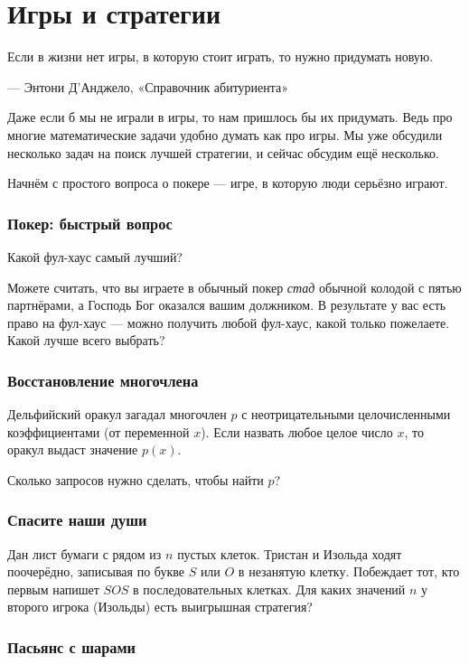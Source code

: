 \chapter{Игры и стратегии}

\setlength{\epigraphwidth}{.63\textwidth}
\epigraph{Если в жизни нет игры, в которую стоит играть, то нужно придумать новую. 
}{— Энтони Д'Анджело, «Справочник абитуриента»}

Даже если б мы не играли в игры, то нам пришлось бы их придумать.
Ведь про многие математические задачи удобно думать как про игры.
Мы уже обсудили несколько задач на поиск лучшей стратегии, и сейчас обсудим ещё несколько.

Начнём с простого вопроса о покере --- игре, в которую люди серьёзно играют.

\subsection*{Покер: быстрый вопрос}

Какой фул-хаус самый лучший?

Можете считать, что вы играете в обычный покер \emph{стад} обычной колодой с пятью партнёрами,
а Господь Бог оказался вашим должником.
В результате у вас есть право на фул-хаус --- можно получить любой фул-хаус, какой только пожелаете.
Какой лучше всего выбрать?

\subsection*{Восстановление многочлена}

Дельфийский оракул загадал многочлен $p$ с неотрицательными целочисленными коэффициентами (от переменной $x$).
Если назвать любое целое число $x$, то оракул выдаст значение $p(x)$.

Сколько запросов нужно сделать, чтобы найти $p$?

\subsection*{Спасите наши души}

Дан лист бумаги с рядом из $n$ пустых клеток.
Тристан и Изольда ходят поочерёдно, записывая по букве $S$ или $O$ в незанятую клетку.
Побеждает тот, кто первым напишет $SOS$ в последовательных клетках.
Для каких значений $n$ у второго игрока (Изольды) есть выигрышная стратегия?

\subsection*{Пасьянс с шарами}

